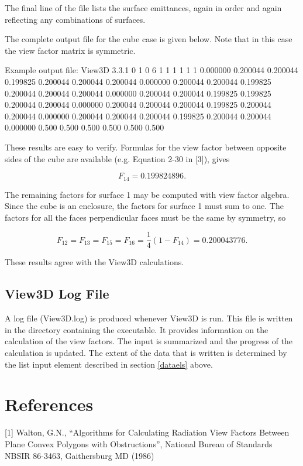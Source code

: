 \documentclass[10pt]{article}
\begin{document}
The final line of the file lists the surface emittances, again in order and
again reflecting any combinations of surfaces.

The complete output file for the cube case is given below.  Note that in this
case the view factor matrix is symmetric.  

\begin{results}
Example output file:
View3D 3.3.1 0 1 0 6          
1 1 1 1 1 1
0.000000 0.200044 0.200044 0.199825 0.200044 0.200044
0.200044 0.000000 0.200044 0.200044 0.199825 0.200044
0.200044 0.200044 0.000000 0.200044 0.200044 0.199825
0.199825 0.200044 0.200044 0.000000 0.200044 0.200044
0.200044 0.199825 0.200044 0.200044 0.000000 0.200044
0.200044 0.200044 0.199825 0.200044 0.200044 0.000000
0.500 0.500 0.500 0.500 0.500 0.500
\end{results}

These results are easy to verify.  Formulas for the view factor between
opposite sides of the cube are available (e.g. Equation 2-30 in [3]), gives

\begin{displaymath}
F_{14}=0.199824896.
\end{displaymath}

The remaining factors for surface 1 may be computed with view factor algebra.
Since the cube is an enclosure, the factors for surface 1 must sum to one.
The factors for all the faces perpendicular faces must be the same by symmetry,
so

\begin{displaymath}
F_{12}=F_{13}=F_{15}=F_{16}=\frac{1}{4}(1-F_{14})=0.200043776.
\end{displaymath}

\noindent
These results agree with the View3D calculations.

\subsection{View3D Log File}
A log file (View3D.log) is produced whenever View3D is run. This file is
written in the directory containing the executable.  It provides information
on the calculation of the view factors.  The input is summarized and the
progress of the calculation is updated.  The extent of the data that is written
is determined by the list input element described in section \ref{dataels} above.

\section{References}
[1] Walton, G.N., ``Algorithms for Calculating Radiation View Factors Between
Plane Convex Polygons with Obstructions'', National Bureau of Standards NBSIR
86-3463, Gaithersburg MD (1986)
\end{document}
